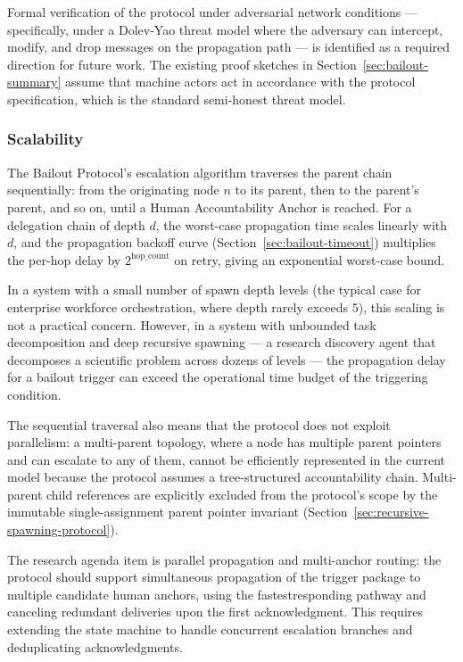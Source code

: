 Formal verification of the protocol under adversarial network conditions — specifically, under a Dolev-Yao threat model where the adversary can intercept, modify, and drop messages on the propagation path — is identified as a required direction for future work. The existing proof sketches in Section~\ref{sec:bailout-summary} assume that machine actors act in accordance with the protocol specification, which is the standard semi-honest threat model.

\subsubsection{Scalability}
\label{sec:limitations-scalability}

The Bailout Protocol's escalation algorithm traverses the parent chain sequentially: from the originating node $n$ to its parent, then to the parent's parent, and so on, until a Human Accountability Anchor is reached. For a delegation chain of depth $d$, the worst-case propagation time scales linearly with $d$, and the propagation backoff curve (Section~\ref{sec:bailout-timeout}) multiplies the per-hop delay by $2^{\text{hop\_count}}$ on retry, giving an exponential worst-case bound.

In a system with a small number of spawn depth levels (the typical case for enterprise workforce orchestration, where depth rarely exceeds 5), this scaling is not a practical concern. However, in a system with unbounded task decomposition and deep recursive spawning — a research discovery agent that decomposes a scientific problem across dozens of levels — the propagation delay for a bailout trigger can exceed the operational time budget of the triggering condition.

The sequential traversal also means that the protocol does not exploit parallelism: a multi-parent topology, where a node has multiple parent pointers and can escalate to any of them, cannot be efficiently represented in the current model because the protocol assumes a tree-structured accountability chain. Multi-parent child references are explicitly excluded from the protocol's scope by the immutable single-assignment parent pointer invariant (Section~\ref{sec:recursive-spawning-protocol}).

The research agenda item is parallel propagation and multi-anchor routing: the protocol should support simultaneous propagation of the trigger package to multiple candidate human anchors, using the fastestresponding pathway and canceling redundant deliveries upon the first acknowledgment. This requires extending the state machine to handle concurrent escalation branches and deduplicating acknowledgments.

